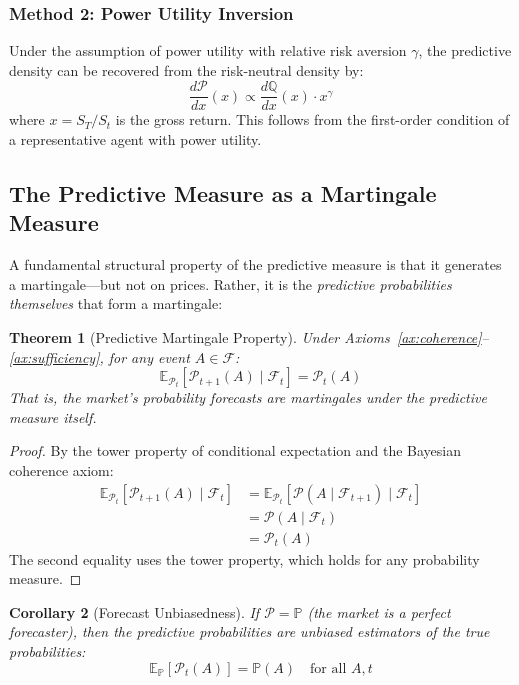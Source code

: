 \documentclass[12pt,a4paper]{article}
\newtheorem{theorem}{Theorem}[section]
\newtheorem{corollary}[theorem]{Corollary}
\theoremstyle{definition}
\newcommand{\E}{\mathbb{E}}
\newcommand{\Prob}{\mathbb{P}}
\newcommand{\Q}{\mathbb{Q}}
\newcommand{\F}{\mathcal{F}}
\newcommand{\PP}{\mathcal{P}}
\begin{document}
\subsubsection{Method 2: Power Utility Inversion}

Under the assumption of power utility with relative risk aversion $\gamma$, the predictive density can be recovered from the risk-neutral density by:
\begin{equation}\label{eq:power_inversion}
    \frac{d\PP}{dx}(x) \propto \frac{d\Q}{dx}(x) \cdot x^{\gamma}
\end{equation}
where $x = S_T/S_t$ is the gross return. This follows from the first-order condition of a representative agent with power utility.

\subsection{The Predictive Measure as a Martingale Measure}

A fundamental structural property of the predictive measure is that it generates a martingale---but not on prices. Rather, it is the \emph{predictive probabilities themselves} that form a martingale:

\begin{theorem}[Predictive Martingale Property]\label{thm:pred_martingale}
Under Axioms~\ref{ax:coherence}--\ref{ax:sufficiency}, for any event $A \in \F$:
\begin{equation}\label{eq:pred_martingale}
    \E_{\PP_t}[\PP_{t+1}(A) \mid \F_t] = \PP_t(A)
\end{equation}
That is, the market's probability forecasts are martingales under the predictive measure itself.
\end{theorem}

\begin{proof}
By the tower property of conditional expectation and the Bayesian coherence axiom:
\begin{align}
    \E_{\PP_t}[\PP_{t+1}(A) \mid \F_t] &= \E_{\PP_t}[\PP(A \mid \F_{t+1}) \mid \F_t] \\
    &= \PP(A \mid \F_t) \\
    &= \PP_t(A)
\end{align}
The second equality uses the tower property, which holds for any probability measure.
\end{proof}

\begin{corollary}[Forecast Unbiasedness]\label{cor:unbiased}
If $\PP = \Prob$ (the market is a perfect forecaster), then the predictive probabilities are unbiased estimators of the true probabilities:
\begin{equation}
    \E_\Prob[\PP_t(A)] = \Prob(A) \quad \text{for all } A, t
\end{equation}
\end{corollary}
\end{document}
